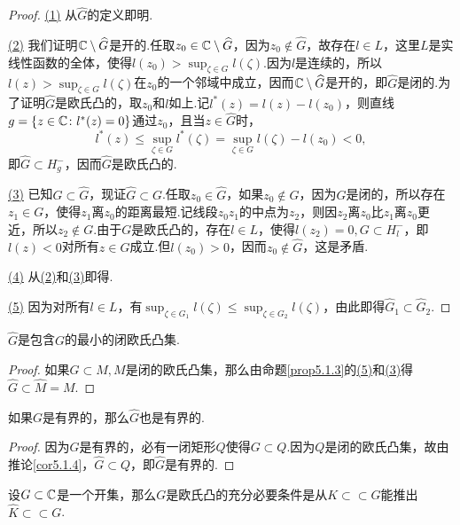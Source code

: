 \begin{proof}
	\hyperlink{5.1.3}{(1)}
	从$\widehat{G}$的定义即明.
	
	\hyperlink{5.1.3}{(2)}
	我们证明$\mathbb C\setminus\widehat{G}$是开的.任取$z_0\in\mathbb C\setminus\widehat{G}$，因为$z_0\notin\widehat{G}$，故存在$l\in L$，这里$L$是实线性函数的全体，使得$l(z_0)>\sup_{\zeta\in G}l(\zeta)$.因为$l$是连续的，所以$l(z)>\sup_{\zeta\in G}l(\zeta)$在$z_0$的一个邻域中成立，因而$\mathbb C\setminus\widehat{G}$是开的，即$\widehat{G}$是闭的.为了证明$\widehat{G}$是欧氏凸的，取$z_0$和$l$如上.记$l^\ast(z)=l(z)-l(z_0)$，则直线$g=\{z\in\mathbb C\colon l^\ast(z)=0\}$通过$z_0$，且当$z\in\widehat{G}$时，
	\[l^\ast(z)\le\sup_{\zeta\in G} l^\ast(\zeta)=\sup_{\zeta\in G}l(\zeta)-l(z_0)<0,\]
	即$\widehat{G}\subset H_g^-$，因而$\widehat{G}$是欧氏凸的.
	
	\hyperlink{5.1.3}{(3)}
	已知$G\subset\widehat{G}$，现证$\widehat{G}\subset G$.任取$z_0\in\widehat{G}$，如果$z_0\notin G$，因为$G$是闭的，所以存在$z_1\in G$，使得$z_1$离$z_0$的距离最短.记线段$z_0z_1$的中点为$z_2$，则因$z_2$离$z_0$比$z_1$离$z_0$更近，所以$z_2\notin G$.由于$G$是欧氏凸的，存在$l\in L$，使得$l(z_2)=0,G\subset H_l^-$，即$l(z)<0$对所有$z\in G$成立.但$l(z_0)>0$，因而$z_0\notin\widehat{G}$，这是矛盾.
	
	\hyperlink{5.1.3}{(4)}
	从\hyperlink{5.1.3}{(2)}和\hyperlink{5.1.3}{(3)}即得.
	
	\hyperlink{5.1.3}{(5)}
	因为对所有$l\in L$，有$\sup_{\zeta\in G_1}l(\zeta)\le\sup_{\zeta\in G_2}l(\zeta)$，由此即得$\widehat{G}_1\subset\widehat{G}_2$.
\end{proof}
\begin{corollary}\label{cor5.1.4}
	$\widehat{G}$是包含$G$的最小的闭欧氏凸集.
\end{corollary}
\begin{proof}
	如果$G\subset M,M$是闭的欧氏凸集，那么由命题\ref{prop5.1.3}的\hyperlink{5.1.3}{(5)}和\hyperlink{5.1.3}{(3)}得$\widehat{G}\subset\widehat{M}=M$.
\end{proof}
\begin{corollary}\label{cor5.1.5}
	如果$G$是有界的，那么$\widehat{G}$也是有界的.
\end{corollary}
\begin{proof}
	因为$G$是有界的，必有一闭矩形$Q$使得$G\subset Q$.因为$Q$是闭的欧氏凸集，故由推论\ref{cor5.1.4}，$\widehat{G}\subset Q$，即$\widehat{G}$是有界的.
\end{proof}
\begin{prop}\label{prop5.1.6}
	设$G\subset\mathbb C$是一个开集，那么$G$是欧氏凸的充分必要条件是从$K\subset\subset G$能推出$\widehat{K}\subset\subset G$.
\end{prop}
